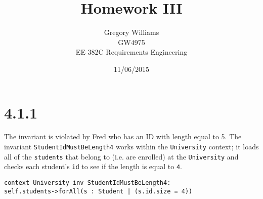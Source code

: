 \documentclass{article}
\title{Homework III}
\author{Gregory Williams\\GW4975\\EE 382C Requirements Engineering}
\date{11/06/2015}
\newcommand{\code}[1]{\colorbox{codegray}{\texttt{#1}}}
\begin{document}
	\maketitle
	
	\section*{4.1.1}
	The invariant is violated by Fred who has an ID with length equal to 5. The invariant \code{StudentIdMustBeLength4} works within the \code{University} context; it loads all of the \code{students} that belong to (i.e. are enrolled) at the \code{University} and checks each student's \code{id} to see if the length is equal to \code{4}.\\
	\begin{center}
	\parbox{0.5\textwidth}{
		\code{context University inv StudentIdMustBeLength4:\\
    	    self.students->forAll(s : Student | (s.id.size = 4))}
	}
	\end{center}
\end{document}
